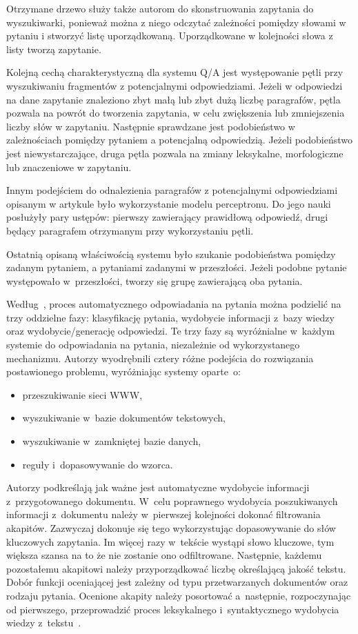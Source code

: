 Otrzymane drzewo służy także autorom do skonstruowania zapytania do wyszukiwarki, ponieważ można z niego odczytać zależności pomiędzy słowami w pytaniu i stworzyć listę uporządkowaną. Uporządkowane w kolejności słowa z listy tworzą zapytanie. 

Kolejną cechą charakterystyczną dla systemu Q/A jest występowanie pętli przy wyszukiwaniu fragmentów z potencjalnymi odpowiedziami. Jeżeli w odpowiedzi na dane zapytanie znaleziono zbyt małą lub zbyt dużą liczbę paragrafów, pętla pozwala na powrót do tworzenia zapytania, w celu zwiększenia lub zmniejszenia liczby słów w zapytaniu. Następnie sprawdzane jest podobieństwo w zależnościach pomiędzy pytaniem a potencjalną odpowiedzią. Jeżeli podobieństwo jest niewystarczające, druga pętla pozwala na zmiany leksykalne, morfologiczne lub znaczeniowe w zapytaniu. 

Innym podejściem do odnalezienia paragrafów z potencjalnymi odpowiedziami opisanym w artykule było wykorzystanie modelu perceptronu. Do jego nauki posłużyły pary ustępów: pierwszy zawierający prawidłową odpowiedź, drugi będący paragrafem otrzymanym przy wykorzystaniu pętli.

Ostatnią opisaną właściwością systemu było szukanie podobieństwa pomiędzy zadanym pytaniem, a pytaniami zadanymi w przeszłości. Jeżeli podobne pytanie występowało w~przeszłości, tworzy się grupę zawierającą oba pytania\cite{hpqa}.

Według~\cite{gupta2012survey}, proces automatycznego odpowiadania na pytania można podzielić na trzy oddzielne fazy: klasyfikację pytania, wydobycie informacji z~bazy wiedzy oraz wydobycie/generację odpowiedzi. Te trzy fazy są wyróżnialne w~każdym systemie do odpowiadania na pytania, niezależnie od wykorzystanego mechanizmu. Autorzy wyodrębnili cztery różne podejścia do rozwiązania postawionego problemu, wyróżniając systemy oparte~o:
\begin{itemize}
	\item przeszukiwanie sieci WWW,
	\item wyszukiwanie w~bazie dokumentów tekstowych,
	\item wyszukiwanie w~zamkniętej bazie danych,
	\item reguły i~dopasowywanie do wzorca.
\end{itemize}

Autorzy podkreślają jak ważne jest automatyczne wydobycie informacji z~przygotowanego dokumentu. W~celu poprawnego wydobycia poszukiwanych informacji z~dokumentu należy w~pierwszej kolejności dokonać filtrowania akapitów. Zazwyczaj dokonuje się tego wykorzystując dopasowywanie do słów kluczowych zapytania. Im więcej razy w~tekście wystąpi słowo kluczowe, tym większa szansa na to że nie zostanie ono odfiltrowane. Następnie, każdemu pozostałemu akapitowi należy przyporządkować liczbę określającą jakość tekstu.
Dobór funkcji oceniającej jest zależny od typu przetwarzanych dokumentów oraz rodzaju pytania. Ocenione akapity należy posortować a~następnie, rozpoczynając od pierwszego, przeprowadzić proces leksykalnego i~syntaktycznego wydobycia wiedzy z~tekstu~\cite{gupta2012survey}.

